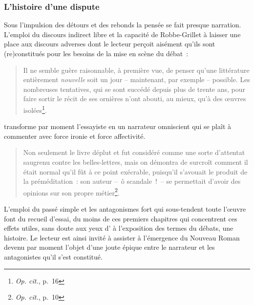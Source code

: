 \documentclass[12pt, a4paper]{article}
\begin{document}


\subsubsection{L'histoire d'une dispute}
\label{histoireDispute}
Sous l'impulsion des détours et des rebonds la pensée se fait presque narration. L'emploi du discours indirect libre et la capacité de Robbe-Grillet à laisser une place aux discours adverses dont le lecteur perçoit aisément qu'ils sont (re)constitués pour les besoins de la mise en scène du débat~: 
\begin{quote}
    Il ne semble guère raisonnable, à première vue, de penser qu’une littérature entièrement \textit{nouvelle} soit un jour – maintenant, par exemple – possible. Les nombreuses tentatives, qui se sont succédé depuis plus de trente ans, pour faire sortir le récit de ses ornières n’ont abouti, au mieux, qu’à des œuvres isolées\footnote{\textit{Op. cit.}, p.~16}.
\end{quote}transforme par moment l'essayiste en un narrateur omniscient qui se plaît à commenter avec force ironie et force affectivité.
\begin{quote}
    Non seulement le livre déplut et fut considéré comme une sorte d’attentat saugrenu contre les belles-lettres, mais on démontra de surcroît comment il était normal qu’il fût à ce point exécrable, puisqu’il s’avouait le produit de la préméditation~: son auteur –~ô scandale~!~– se permettait d’avoir des opinions sur son propre métier\footnote{\textit{Op. cit.}, p.~10}.
\end{quote}
L'emploi du passé simple et les antagonismes fort qui sous-tendent toute l'œuvre font du recueil d'essai, du moins de ces premiers chapitres qui concentrent ces effets utiles, sans doute aux yeux d'\robbe{} à l'exposition des termes du débats, une histoire. Le lecteur est ainsi invité à assister à l'émergence du Nouveau Roman devenu par moment l'objet d'une joute épique entre le narrateur et les antagonistes qu'il s'est constitué.
\end{document}

